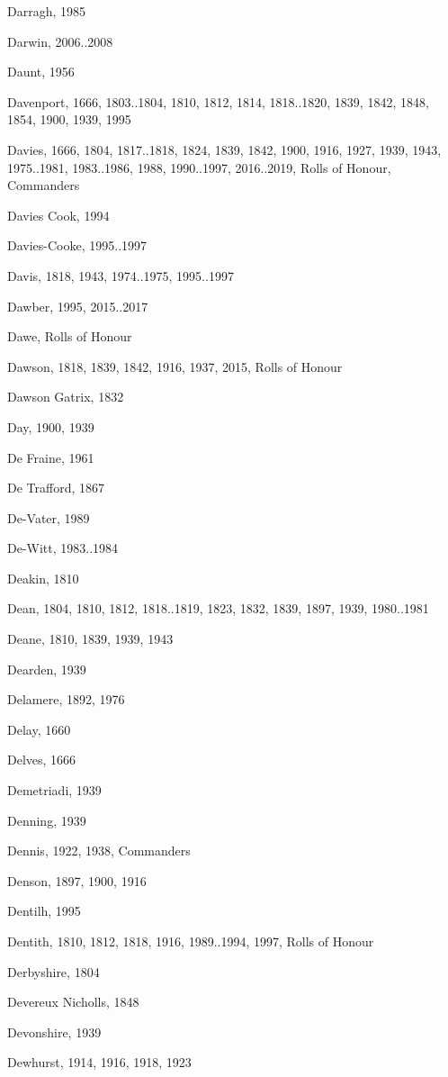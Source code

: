 \begin{theindex}
\item Darragh, 1985
\item Darwin, 2006..2008
\item Daunt, 1956
\item Davenport, 1666, 1803..1804, 1810, 1812, 1814, 1818..1820, 1839, 1842, 1848, 1854, 1900, 1939, 1995
\item Davies, 1666, 1804, 1817..1818, 1824, 1839, 1842, 1900, 1916, 1927, 1939, 1943, 1975..1981, 1983..1986, 1988, 1990..1997, 2016..2019, Rolls of Honour, Commanders
\item Davies Cook, 1994
\item Davies-Cooke, 1995..1997
\item Davis, 1818, 1943, 1974..1975, 1995..1997
\item Dawber, 1995, 2015..2017
\item Dawe, Rolls of Honour
\item Dawson, 1818, 1839, 1842, 1916, 1937, 2015, Rolls of Honour
\item Dawson Gatrix, 1832
\item Day, 1900, 1939
\item De Fraine, 1961
\item De Trafford, 1867
\item De-Vater, 1989
\item De-Witt, 1983..1984
\item Deakin, 1810
\item Dean, 1804, 1810, 1812, 1818..1819, 1823, 1832, 1839, 1897, 1939, 1980..1981
\item Deane, 1810, 1839, 1939, 1943
\item Dearden, 1939
\item Delamere, 1892, 1976
\item Delay, 1660
\item Delves, 1666
\item Demetriadi, 1939
\item Denning, 1939
\item Dennis, 1922, 1938, Commanders
\item Denson, 1897, 1900, 1916
\item Dentilh, 1995
\item Dentith, 1810, 1812, 1818, 1916, 1989..1994, 1997, Rolls of Honour
\item Derbyshire, 1804
\item Devereux Nicholls, 1848
\item Devonshire, 1939
\item Dewhurst, 1914, 1916, 1918, 1923

\end{theindex}
